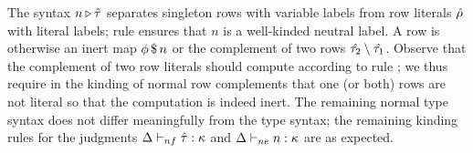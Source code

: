 \documentclass[sigplan,10pt,anonymous,review]{acmart}\settopmatter{printfolios=true,printccs=false,printacmref=false}
\begin{document}
The syntax $n \triangleright \hat{\tau}$ separates singleton rows with variable labels from row literals $\hat{\rho}$ with literal labels; rule \kruleNF{$\triangleright$} ensures that $n$ is a well-kinded neutral label.  A row is otherwise an inert map ${\phi} \, \mathdollar \, n$ or the complement of two rows $\hat{\tau_2} \setminus \hat{\tau_1}$. Observe that the complement of two row literals should compute according to rule \erule{$\Compl$}; we thus require in the kinding of normal row complements \kruleNF{$\Compl$} that one (or both) rows are not literal so that the computation is indeed inert. The remaining normal type syntax does not differ meaningfully from the type syntax; the remaining kinding rules for the judgments $\Delta \vdash_{nf} \hat{\tau} : \kappa$ and $\Delta \vdash_{ne} n : \kappa$ are as expected.


\end{document}

